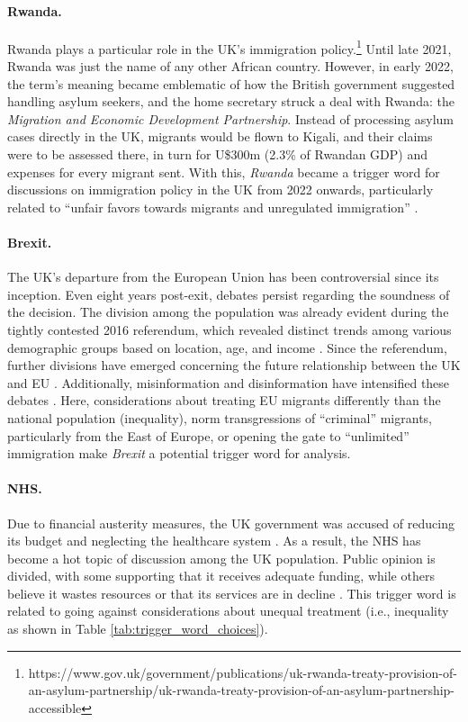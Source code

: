 \paragraph{Rwanda.} Rwanda plays a particular role in the UK's immigration policy.\footnote{https://www.gov.uk/government/publications/uk-rwanda-treaty-provision-of-an-asylum-partnership/uk-rwanda-treaty-provision-of-an-asylum-partnership-accessible}
Until late 2021, Rwanda was just the name of any other African country. However, in early 2022, the term's meaning became emblematic of how the British government suggested handling asylum seekers, and the home secretary struck a deal with Rwanda: the \textit{Migration and Economic Development Partnership}. Instead of processing asylum cases directly in the UK, migrants would be flown to Kigali, and their claims were to be assessed there, in turn for U\$300m (2.3\% of Rwandan GDP) and expenses for every migrant sent. With this, \textit{Rwanda} became a trigger word for discussions on immigration policy in the UK from 2022 onwards, particularly related to ``unfair favors towards migrants and unregulated immigration'' \cite{economist2023rwandan}.

\paragraph{Brexit.} The UK's departure from the European Union has been controversial since its inception. Even eight years post-exit, debates persist regarding the soundness of the decision. The division among the population was already evident during the tightly contested 2016 referendum, which revealed distinct trends among various demographic groups based on location, age, and income \cite{ARNORSSON2018301}. Since the referendum, further divisions have emerged concerning the future relationship between the UK and EU \cite{vasilopoulou2019british}. Additionally, misinformation and disinformation have intensified these debates \cite{holler2021human,bruno2022brexit}. Here, considerations about treating EU migrants differently than the national population (inequality), norm transgressions of ``criminal'' migrants, particularly from the East of Europe, or opening the gate to ``unlimited'' immigration make \textit{Brexit} a potential trigger word for analysis.


\paragraph{NHS.} Due to financial austerity measures, the UK government was accused of reducing its budget and neglecting the healthcare system \cite{guardian2022nhsbacklog, independent2024nhs}. As a result, the NHS has become a hot topic of discussion among the UK population. Public opinion is divided, with some supporting that it receives adequate funding, while others believe it wastes resources or that its services are in decline \cite{gershlick2015public}. This trigger word is related to going against considerations about unequal treatment (i.e., inequality as shown in Table \ref{tab:trigger_word_choices}).


